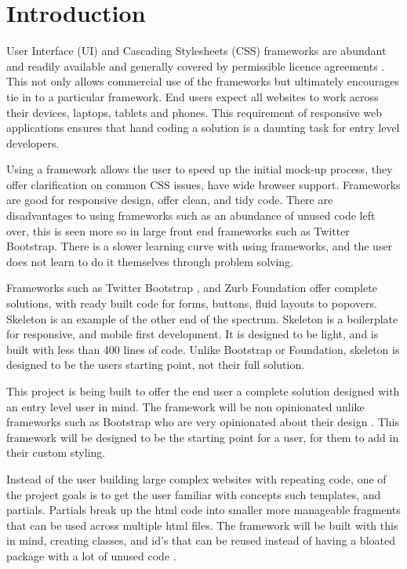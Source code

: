 \newpage
\chapter*{Introduction}

%
%

User Interface (UI) and Cascading Stylesheets (CSS) frameworks are abundant and readily available and generally covered by permissible licence agreements \citep{CODY16}. This not only allows commercial use of the frameworks but ultimately encourages tie in to a particular framework. End users expect all websites to work across their devices, laptops, tablets and phones. This requirement of responsive web applications ensures that hand coding a solution is a daunting task for entry level developers.

Using a framework allows the user to speed up the initial mock-up process, they offer clarification on common CSS issues, have wide browser support. Frameworks are good for responsive design, offer clean, and tidy code. There are disadvantages to using frameworks such as an abundance of unused code left over, this is seen more so in large front end frameworks such as Twitter Bootstrap. There is a slower learning curve with using frameworks, and the user does not learn to do it themselves through problem solving. 

Frameworks such as Twitter Bootstrap \citep{SASS16}, and Zurb Foundation \citep{LESS16} offer complete solutions, with ready built code for forms, buttons, fluid layouts to popovers. Skeleton \citep{SKEL16} is an example of the other end of the spectrum. Skeleton is a boilerplate for responsive, and mobile first development. It is designed to be light, and is built with less than 400 lines of code. Unlike Bootstrap or Foundation, skeleton is designed to be the users starting point, not their full solution. 

This project is being built to offer the end user a complete solution designed with an entry level user in mind. The framework will be non opinionated unlike frameworks such as Bootstrap who are very opinionated about their design \citet{KEMH16}. This framework will be designed to be the starting point for a user, for them to add in their custom styling. 

Instead of the user building large complex websites with repeating code, one of the project goals is to get the user familiar with concepts such templates, and partials. Partials break up the html code into smaller more manageable fragments that can be used across multiple html files. The framework will be built with this in mind, creating classes, and id's that can be reused instead of having a bloated package with a lot of unused code \citep{KAR15}.

